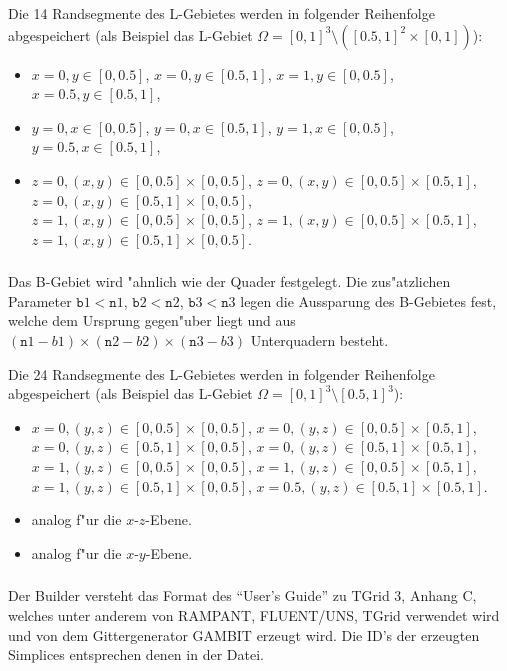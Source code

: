\documentclass[11pt,a4paper]{article}
\begin{document}
Die 14 Randsegmente des L-Gebietes werden in folgender Reihenfolge
abgespeichert (als Beispiel das L-Gebiet $\Omega=[0,1]^3\setminus
([0.5,1]^2\times[0,1])$):
\begin{itemize}
    \item $x=0, y\in[0,0.5]$, \quad
    $x=0, y\in[0.5,1]$, \quad
    $x=1, y\in[0,0.5]$, \quad
    $x=0.5, y\in[0.5,1]$,
    \item $y=0, x\in[0,0.5]$, \quad
    $y=0, x\in[0.5,1]$, \quad
    $y=1, x\in[0,0.5]$, \quad
    $y=0.5, x\in[0.5,1]$,
    \item $z=0, (x,y)\in[0,0.5]\times[0,0.5]$, \quad
    $z=0, (x,y)\in[0,0.5]\times[0.5,1]$, \quad
    $z=0, (x,y)\in[0.5,1]\times[0,0.5]$, \\
    $z=1, (x,y)\in[0,0.5]\times[0,0.5]$, \quad
    $z=1, (x,y)\in[0,0.5]\times[0.5,1]$, \quad
    $z=1, (x,y)\in[0.5,1]\times[0,0.5]$.
\end{itemize}
 
\subsubsection{}  Das B-Gebiet wird "ahnlich wie der Quader
festgelegt. Die zus"atzlichen Parameter ${\mathtt b1}<{\mathtt n1}$, ${\mathtt
b2}<{\mathtt n2}$, ${\mathtt b3}<{\mathtt n3}$ legen die Aussparung des
B-Gebietes fest, welche dem Ursprung gegen"uber liegt und aus $({\mathtt
n1-b1})\times({\mathtt n2-b2})\times({\mathtt n3-b3})$ Unterquadern besteht.

Die 24 Randsegmente des L-Gebietes werden in folgender Reihenfolge
abgespeichert (als Beispiel das L-Gebiet $\Omega=[0,1]^3\setminus [0.5,1]^3$):
\begin{itemize}
    \item $x=0, (y,z)\in[0,0.5]\times[0,0.5]$, \quad
    $x=0, (y,z)\in[0,0.5]\times[0.5,1]$, \quad
    $x=0, (y,z)\in[0.5,1]\times[0,0.5]$, \quad
    $x=0, (y,z)\in[0.5,1]\times[0.5,1]$, \\
    $x=1, (y,z)\in[0,0.5]\times[0,0.5]$, \quad
    $x=1, (y,z)\in[0,0.5]\times[0.5,1]$, \quad
    $x=1, (y,z)\in[0.5,1]\times[0,0.5]$, \quad
    $x=0.5, (y,z)\in[0.5,1]\times[0.5,1]$.
    \item analog f"ur die $x$-$z$-Ebene.
    \item analog f"ur die $x$-$y$-Ebene.
\end{itemize}

\subsubsection{}
Der Builder versteht das Format des "`User's Guide"' zu TGrid 3, Anhang C, welches
unter anderem von RAMPANT, FLUENT/UNS, TGrid verwendet wird und von dem
Gittergenerator GAMBIT erzeugt wird.
Die ID's der erzeugten Simplices entsprechen denen in der Datei.
\end{document}
